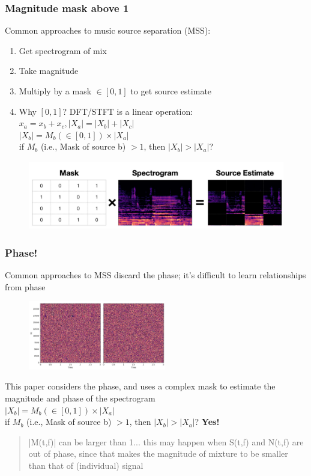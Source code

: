 \documentclass[usenames,dvipsnames]{beamer}
\begin{document}
\begin{frame}
	\frametitle{Magnitude mask above 1}
	Common approaches to music source separation (MSS):
	\begin{enumerate}
		\item
			Get spectrogram of mix
		\item
			Take magnitude
		\item
			Multiply by a mask $\in [0, 1]$ to get source estimate
		\item
			Why $[0, 1]$? DFT/STFT is a linear operation: $x_{a} = x_{b} + x_{c}, |X_{a}| = |X_{b}| + |X_{c}|$\\
			$|X_{b}| = M_{b}(\in [0, 1]) \times |X_{a}|$\\
			if $M_{b}$ (i.e., Mask of source b) $> 1$, then $|X_{b}| > |X_{a}|$?
	\end{enumerate}
	\begin{figure}
	\centering
	\includegraphics[height=3cm]{./images-mss/mask_simple.png}
	\end{figure}
\end{frame}

\begin{frame}
	\frametitle{Phase!}
	Common approaches to MSS discard the phase; it's difficult to learn relationships from phase
	\begin{figure}
	\centering
	\includegraphics[height=3cm]{./images-mss/whynophase.png}
	\end{figure}
	This paper considers the phase, and uses a complex mask to estimate the magnitude and phase of the spectrogram\\
	$|X_{b}| = M_{b}(\in [0, 1]) \times |X_{a}|$\\
	if $M_{b}$ (i.e., Mask of source b) $> 1$, then $|X_{b}| > |X_{a}|$?
	\textbf{Yes!} 
	\begin{quote}
		|M(t,f)| can be larger than 1... this may happen when S(t,f) and N(t,f) are out of phase, since that makes the magnitude of mixture to be smaller than that of (individual) signal
	\end{quote}
\end{frame}
\end{document}
